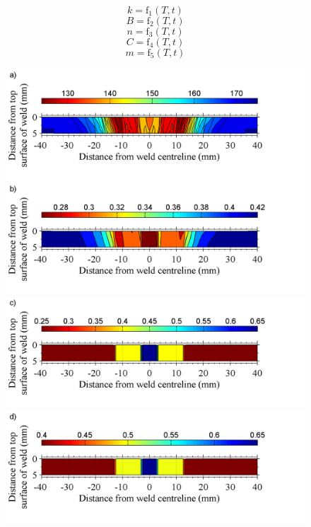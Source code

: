 \begin{equation}
\label{eq3}
k=\text{f}_1(T,t)
\end{equation}
\begin{equation}
\label{eq4}
B=\text{f}_2(T,t)
\end{equation}
\begin{equation}
\label{eq5}
n=\text{f}_3(T,t)
\end{equation}
\begin{equation}
\label{eq6}
C=\text{f}_4(T,t)
\end{equation}
\begin{equation}
\label{eq7}
m=\text{f}_5(T,t)
\end{equation}
\begin{figure}[h!]
	\centering
	\includegraphics[width=1\linewidth]{JCHValtered}
	\includegraphics[width=1\linewidth]{JCAaltered}
	\includegraphics[width=1\linewidth]{JCBaltered}
	\includegraphics[width=1\linewidth]{JCnaltered}

\end{figure}
